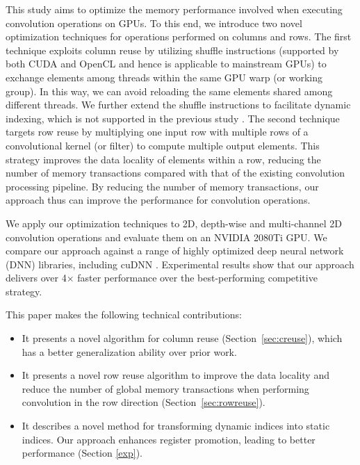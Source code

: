 This study aims to optimize the memory performance involved when executing convolution operations on GPUs. To this end, we introduce two novel optimization techniques
for operations performed on columns and rows. The first technique exploits column reuse by utilizing shuffle instructions (supported by
both CUDA and OpenCL and hence is applicable to mainstream GPUs) to exchange elements among threads within the same GPU warp (or working
group). In this way, we can avoid reloading the same elements shared among different threads. We further extend the shuffle instructions to
facilitate dynamic indexing, which is not supported in the previous study \cite{vasilache2014fast}. The second technique targets row reuse
by multiplying one input row with multiple rows of a convolutional kernel (or filter) to compute multiple output elements. This strategy
improves the data locality of elements within a row, reducing the number of memory transactions compared with that of the
existing convolution processing pipeline. By reducing the number of memory transactions, our approach thus can improve the performance for
convolution operations.

We apply our optimization techniques to 2D,  depth-wise and multi-channel 2D convolution operations and evaluate them on an NVIDIA 2080Ti GPU. We compare
our approach against a range of highly optimized  deep neural network (DNN) libraries, including cuDNN \cite{ChetlurWVCTCS14}. Experimental
results show that our approach delivers over 4$\times$ faster performance over the best-performing competitive strategy.

This paper makes the following technical contributions:
\begin{itemize}
  \item It presents a novel algorithm for column reuse (Section~\ref{sec:creuse}), which has a better generalization
      ability over prior work.
  \item It presents a novel row reuse algorithm to improve the data locality and reduce the number of global memory transactions when
      performing convolution in the row direction (Section~\ref {sec:rowreuse}).
  \item It describes a novel method for transforming dynamic indices into static indices. Our approach enhances register promotion,
      leading to better performance (Section \ref{exp}).
\end{itemize}

